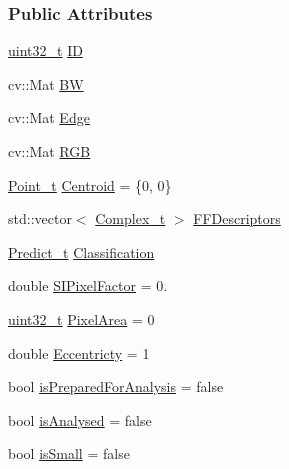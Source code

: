 \subsubsection*{Public Attributes}
\begin{DoxyCompactItemize}
\item 
\hyperlink{_soil_math_types_8h_a435d1572bf3f880d55459d9805097f62}{uint32\+\_\+t} \hyperlink{class_soil_analyzer_1_1_particle_a2e8100d7c87bd754929fa957982ff5e5}{I\+D}
\item 
cv\+::\+Mat \hyperlink{class_soil_analyzer_1_1_particle_a885a9f3ca828244a72c5866fff7d2e89}{B\+W}
\item 
cv\+::\+Mat \hyperlink{class_soil_analyzer_1_1_particle_a0933445f172fb27b7bade9740938a2a5}{Edge}
\item 
cv\+::\+Mat \hyperlink{class_soil_analyzer_1_1_particle_a5c3457748fc4f3309bffdcb635c70458}{R\+G\+B}
\item 
\hyperlink{struct_soil_analyzer_1_1_point__t}{Point\+\_\+t} \hyperlink{class_soil_analyzer_1_1_particle_a2a6ccf71f20c6a2e3a18e6cf04c887dc}{Centroid} = \{0, 0\}
\item 
std\+::vector$<$ \hyperlink{_soil_math_types_8h_a26c307796ad803485b0376c90026d8f7}{Complex\+\_\+t} $>$ \hyperlink{class_soil_analyzer_1_1_particle_ad953f0d8c12018f61cd957b28c1a56ae}{F\+F\+Descriptors}
\item 
\hyperlink{_soil_math_types_8h_aaeba766195a440b2539f0438d3d41f95}{Predict\+\_\+t} \hyperlink{class_soil_analyzer_1_1_particle_aaa5091f3028af9e5ff9aee5548c8783c}{Classification}
\item 
double \hyperlink{class_soil_analyzer_1_1_particle_a5156110e9617d656a7b878a8a0fbe024}{S\+I\+Pixel\+Factor} = 0.
\item 
\hyperlink{_soil_math_types_8h_a435d1572bf3f880d55459d9805097f62}{uint32\+\_\+t} \hyperlink{class_soil_analyzer_1_1_particle_ab1489af35ea29e20ee080c24ce617c66}{Pixel\+Area} = 0
\item 
double \hyperlink{class_soil_analyzer_1_1_particle_afbcac116303747794d8e00b99364d2a4}{Eccentricty} = 1
\item 
bool \hyperlink{class_soil_analyzer_1_1_particle_aead45a461f496be6fa4a200fb0d8a150}{is\+Prepared\+For\+Analysis} = false
\item 
bool \hyperlink{class_soil_analyzer_1_1_particle_aeae83a2d48d7682f7017210a2730b48b}{is\+Analysed} = false
\item 
bool \hyperlink{class_soil_analyzer_1_1_particle_a56c5d77365850a29011cf069cce90445}{is\+Small} = false
\end{DoxyCompactItemize}
